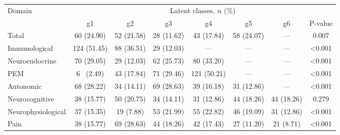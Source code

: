 \begin{tabular}{lccccccc} 
\toprule
\multirow{2}{*}{Domain} & \multicolumn{7}{c}{Latent classes, $n$ (\%)}                                                        \\ 
\cmidrule{2-8}
                        & g1          & g2         & g3         & g4           & g5         & g6         & P-value  \\ 
\midrule
Total                   & 60 (24.90)  & 52 (21.58) & 28 (11.62) & 43 (17.84)   & 58 (24.07) & ---        & 0.007  \\ 
Immunological           & 124 (51.45) & 88 (36.51) & 29 (12.03) & ---          & ---        & ---        & <0.001 \\ 
Neuroendocrine          & 70 (29.05)  & 29 (12.03) & 62 (25.73) & 80 (33.20)   & ---        & ---        & <0.001 \\ 
PEM                     & 6~ (2.49)   & 43 (17.84) & 71 (29.46) & 121 (50.21)  & ---        & ---        & <0.001 \\ 
Autonomic               & 68 (28.22)  & 34 (14.11) & 69 (28.63) & 39 (16.18)   & 31 (12.86) & ---        & <0.001 \\ 
Neurocognitive          & 38 (15.77)  & 50 (20.75) & 34 (14.11) & 31 (12.86)   & 44 (18.26) & 44 (18.26) & 0.279  \\ 
Neurophysiological      & 37 (15.35)  & 19 (7.88)  & 53 (21.99) & 55 (22.82)   & 46 (19.09) & 31 (12.86) & <0.001 \\ 
Pain                    & 38 (15.77)  & 69 (28.63) & 44 (18.26) & 42 (17.43)   & 27 (11.20) & 21 (8.71)  & <0.001 \\
\bottomrule
\end{tabular}